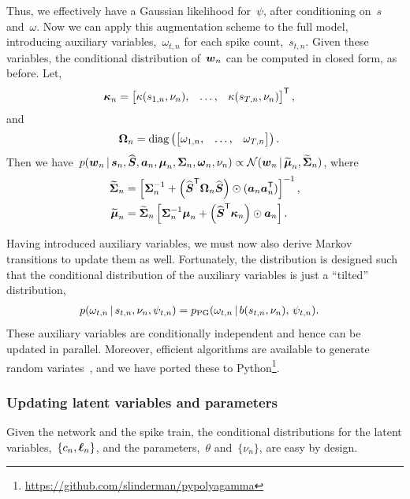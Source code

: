 Thus, we effectively have a Gaussian likelihood for~$\psi$, after conditioning 
on~$s$ and~$\omega$. Now we can apply this augmentation scheme to the full
model, introducing auxiliary variables,~$\omega_{t,n}$ for each spike count,~$s_{t,n}$.
Given these variables, the conditional distribution of~$\boldsymbol{w}_n$ can be computed in closed form,
as before. Let,
\begin{align}
  \boldsymbol{\kappa}_n
  &= \begin{bmatrix} \kappa(s_{1,n}, \nu_n), &\ldots, &\kappa(s_{T,n}, \nu_n)
  \end{bmatrix}^{\mathsf{T}},
\end{align}
and
\begin{align}
  \boldsymbol{\Omega}_n &= \mathrm{diag} \left(
  \begin{bmatrix}
    \omega_{1,n}, & \ldots, & \omega_{T,n}
  \end{bmatrix}
  \right).
\end{align}
Then we have~$
  p(\boldsymbol{w}_n \,|\, \boldsymbol{s}_n,  \widehat{\boldsymbol{S}}, \boldsymbol{a}_n, \boldsymbol{\mu}_n, \boldsymbol{\Sigma}_n, \boldsymbol{\omega}_n, \nu_n)
  \propto \mathcal{N}(\boldsymbol{w}_n \,|\, \widetilde{\boldsymbol{\mu}}_n, \widetilde{\boldsymbol{\Sigma}}_n)$,
where
\begin{align}
  \widetilde{\boldsymbol{\Sigma}}_n &= \left[ \boldsymbol{\Sigma}_n^{-1} +
  \left(\widehat{\boldsymbol{S}}^{\mathsf{T}} \boldsymbol{\Omega}_n \widehat{\boldsymbol{S}} \right) \odot (\boldsymbol{a}_n \boldsymbol{a}_n^{\mathsf{T}}) \right]^{-1}, \\
  \widetilde{\boldsymbol{\mu}}_n &= \widetilde{\boldsymbol{\Sigma}}_n \left[ \boldsymbol{\Sigma}_n^{-1} \boldsymbol{\mu}_n +
  \left(\widehat{\boldsymbol{S}}^{\mathsf{T}} \boldsymbol{\kappa}_n \right) \odot \boldsymbol{a}_n \right].
\end{align}

Having introduced auxiliary variables, we must now also derive
Markov transitions to update them as well. Fortunately, the
\polyagamma distribution is designed such that the conditional
distribution of the auxiliary variables is just a ``tilted'' \polyagamma
distribution,
\begin{align}
  p(\omega_{t,n} \,|\, s_{t,n}, \nu_n, \psi_{t,n})
  &= p_{\mathrm{PG}}(\omega_{t,n} \,|\, b(s_{t,n}, \nu_n), \, \psi_{t,n}).
\end{align}
These auxiliary variables are conditionally independent and hence can
be updated in parallel. Moreover, efficient algorithms are available
to generate \polyagamma random variates~\cite{windle2014sampling}, and
we have ported these to Python\footnote{\url{https://github.com/slinderman/pypolyagamma}}.

\subsubsection{Updating latent variables and parameters}
Given the network and the spike train, the conditional distributions 
for the latent variables,~$\{c_n, \boldsymbol{\ell}_n\}$, and the parameters,~$\theta$ and~$\{\nu_n\}$,
are easy by design. 

